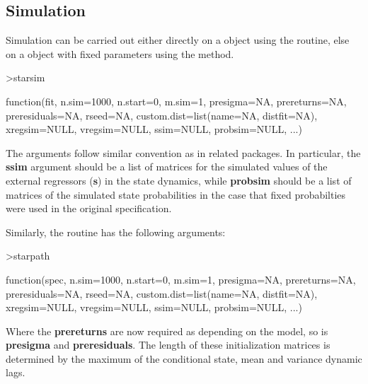 \subsection{Simulation}
Simulation can be carried out either directly on a  object using
the  routine, else on a  object with fixed
parameters using the  method.

\begin{Schunk}
\begin{Sinput}
>starsim
\end{Sinput}
\begin{Soutput}
function(fit, n.sim=1000, n.start=0, m.sim=1, presigma=NA, prereturns=NA, 
preresiduals=NA, rseed=NA, custom.dist=list(name=NA, distfit=NA), 
xregsim=NULL, vregsim=NULL, ssim=NULL, probsim=NULL, ...)
\end{Soutput}
\end{Schunk}
The arguments follow similar convention as in related packages. In particular,
the \textbf{ssim} argument should be a list of matrices for the
simulated values of the external regressors (\textbf{s}) in the state dynamics,
while \textbf{probsim} should be a list of matrices of the simulated state
probabilities in the case that fixed probabilties were used in the original
specification.

Similarly, the  routine has the following arguments:
\begin{Schunk}
\begin{Sinput}
>starpath
\end{Sinput}
\begin{Soutput}
function(spec, n.sim=1000, n.start=0, m.sim=1, presigma=NA, prereturns=NA, 
preresiduals=NA, rseed=NA, custom.dist=list(name=NA, distfit=NA), 
xregsim=NULL, vregsim=NULL, ssim=NULL, probsim=NULL, ...)
\end{Soutput}
\end{Schunk}
Where the \textbf{prereturns} are now required as depending on the model, so is
\textbf{presigma} and \textbf{preresiduals}. The length of these initialization
matrices is determined by the maximum of the conditional state, mean and
variance dynamic lags.


